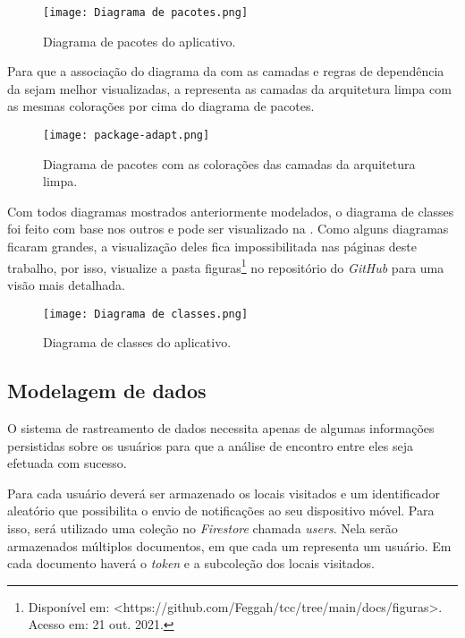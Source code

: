 \begin{figure}[!htb]
  \centering
  \texttt{[image: Diagrama de pacotes.png]}
  \caption{Diagrama de pacotes do aplicativo.}
  \label{fig:package}
\end{figure}

Para que a associação do diagrama da  com as camadas e regras de dependência da  sejam melhor visualizadas, a  representa as camadas da arquitetura limpa com as mesmas colorações por cima do diagrama de pacotes.

\begin{figure}[!htb]
  \centering
  \texttt{[image: package-adapt.png]}
  \caption{Diagrama de pacotes com as colorações das camadas da arquitetura limpa.}
  \label{fig:package2}
\end{figure}

Com todos diagramas mostrados anteriormente modelados, o diagrama de classes foi feito com base nos outros e pode ser visualizado na . Como alguns diagramas ficaram grandes, a visualização deles fica impossibilitada nas páginas deste trabalho, por isso, visualize a pasta figuras\footnote{Disponível em: <https://github.com/Feggah/tcc/tree/main/docs/figuras>. Acesso em: 21 out. 2021.} no repositório do \textit{GitHub} para uma visão mais detalhada.

\begin{figure}[!htb]
  \centering
  \texttt{[image: Diagrama de classes.png]}
  \caption{Diagrama de classes do aplicativo.}
  \label{fig:diagramadeclasses}
\end{figure}

\subsection{Modelagem de dados}
O sistema de rastreamento de dados necessita apenas de algumas informações persistidas sobre os usuários para que a análise de encontro entre eles seja efetuada com sucesso. 

Para cada usuário deverá ser armazenado os locais visitados e um identificador aleatório que possibilita o envio de notificações ao seu dispositivo móvel. Para isso, será utilizado uma coleção no \textit{Firestore} chamada \textit{users}. Nela serão armazenados múltiplos documentos, em que cada um representa um usuário. Em cada documento haverá o \textit{token} e a subcoleção dos locais visitados.

